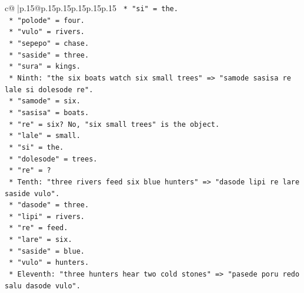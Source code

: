 \documentclass{article}
\begin{document}
{\begin{supertabular}{c@{$\;$}|p{.15\linewidth}@{}p{.15\linewidth}p{.15\linewidth}p{.15\linewidth}p{.15\linewidth}p{.15\linewidth}}
{{{\texttt{                                    *   "si" = the.} \\
\texttt{                                    *   "polode" = four.} \\
\texttt{                                    *   "vulo" = rivers.} \\
\texttt{                                    *   "sepepo" = chase.} \\
\texttt{                                    *   "saside" = three.} \\
\texttt{                                    *   "sura" = kings.} \\
\texttt{                                *   Ninth: "the six boats watch six small trees" => "samode sasisa re lale si dolesode re".} \\
\texttt{                                    *   "samode" = six.} \\
\texttt{                                    *   "sasisa" = boats.} \\
\texttt{                                    *   "re" = six? No, "six small trees" is the object.} \\
\texttt{                                    *   "lale" = small.} \\
\texttt{                                    *   "si" = the.} \\
\texttt{                                    *   "dolesode" = trees.} \\
\texttt{                                    *   "re" = ?} \\
\texttt{                                *   Tenth: "three rivers feed six blue hunters" => "dasode lipi re lare saside vulo".} \\
\texttt{                                    *   "dasode" = three.} \\
\texttt{                                    *   "lipi" = rivers.} \\
\texttt{                                    *   "re" = feed.} \\
\texttt{                                    *   "lare" = six.} \\
\texttt{                                    *   "saside" = blue.} \\
\texttt{                                    *   "vulo" = hunters.} \\
\texttt{                                *   Eleventh: "three hunters hear two cold stones" => "pasede poru redo salu dasode vulo".} \\
}}}
\end{supertabular}}
\end{document}
